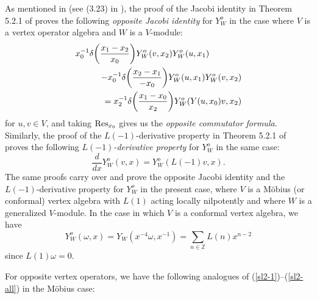 \documentclass[12pt]{article}
\begin{document}
As mentioned in \cite{tensor1} (see (3.23) in \cite{tensor1}), the
proof of the Jacobi identity in Theorem 5.2.1 of \cite{FHL} proves the
following {\it opposite Jacobi identity} for $Y^o_{W}$ in the case
where $V$ is a vertex operator algebra and $W$ is a $V$-module:
\begin{eqnarray}\label{op-jac-id}
\lefteqn{\dps x_{0}^{-1}\delta\bigg(\frac{x_{1}-x_{2}}{x_{0}}\bigg)
Y_{W}^o(v, x_{2})Y^o_{W}(u, x_{1})}\nno\\
&&\hspace{2em}-x_{0}^{-1}\delta\bigg(\frac{x_{2}-x_{1}}{-x_{0}}\bigg)
Y_{W}^o(u, x_{1})Y^o_{W}(v, x_{2})\nno\\
&&{\dps =x_{2}^{-1}\delta\bigg(\frac{x_{1}-x_{0}}{x_{2}}\bigg)
Y_{W}^o(Y(u, x_{0})v, x_{2})}
\end{eqnarray}
for $u,v \in V$, and taking ${\rm Res}_{x_{0}}$ gives us the {\it
opposite commutator formula}.  Similarly, the proof of the
$L(-1)$-derivative property in Theorem 5.2.1 of \cite{FHL} proves the
following {\it $L(-1)$-derivative property} for $Y^o_{W}$ in the same
case:
\begin{equation}\label{yo-l-1}
\frac{d}{dx} Y^o_{W}(v,x) = Y^o_{W}(L(-1)v,x).
\end{equation}
The same proofs carry over and prove the opposite Jacobi identity and
the $L(-1)$-derivative property
for $Y^o_{W}$  in the present case, where $V$ is a M\"obius (or
conformal) vertex algebra with $L(1)$ acting locally nilpotently and
where $W$ is a generalized $V$-module.  In the case in which $V$ is a
conformal vertex algebra, we have
\begin{equation}\label{Yoppositeomega}
Y^o_{W}(\omega,x) = Y_{W}(x^{-4}\omega,x^{-1})
=\sum_{n\in {\mathbb Z}}L(n)x^{n-2}
\end{equation}
since $L(1)\omega = 0$.

For opposite vertex operators, we have the following analogues of
(\ref{sl2-1})--(\ref{sl2-all}) in the M\"obius case:
\end{document}
